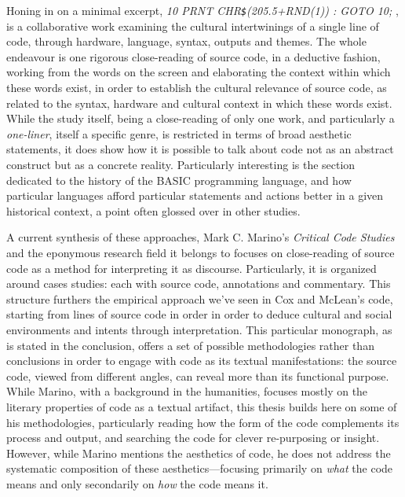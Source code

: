 Honing in on a minimal excerpt, \emph{10 PRNT CHR\lstinline{$}(205.5+RND(1)) : GOTO 10;} \citep{montfort_10_2014}, is a collaborative work examining the cultural intertwinings of a single line of code, through hardware, language, syntax, outputs and themes. The whole endeavour is one rigorous close-reading of source code, in a deductive fashion, working from the words on the screen and elaborating the context within which these words exist, in order to establish the cultural relevance of source code, as related to the syntax, hardware and cultural context in which these words exist. While the study itself, being a close-reading of only one work, and particularly a \emph{one-liner}, itself a specific genre, is restricted in terms of broad aesthetic statements, it does show how it is possible to talk about code not as an abstract construct but as a concrete reality. Particularly interesting is the section dedicated to the history of the BASIC programming language, and how particular languages afford particular statements and actions better in a given historical context, a point often glossed over in other studies.

A current synthesis of these approaches, Mark C. Marino's \emph{Critical Code Studies} \citep{marino_critical_2020} and the eponymous research field it belongs to focuses on close-reading of source code as a method for interpreting it as discourse. Particularly, it is organized around cases studies: each with source code, annotations and commentary. This structure furthers the empirical approach we've seen in Cox and McLean's code, starting from lines of source code in order in order to deduce cultural and social environments and intents through interpretation. This particular monograph, as is stated in the conclusion, offers a set of possible methodologies rather than conclusions in order to engage with code as its textual manifestations: the source code, viewed from different angles, can reveal more than its functional purpose. While Marino, with a background in the humanities, focuses mostly on the literary properties of code as a textual artifact, this thesis builds here on some of his methodologies, particularly reading how the form of the code complements its process and output, and searching the code for clever re-purposing or insight. However, while Marino mentions the aesthetics of code, he does not address the systematic composition of these aesthetics—focusing primarily on \emph{what} the code means and only secondarily on \emph{how} the code means it.

